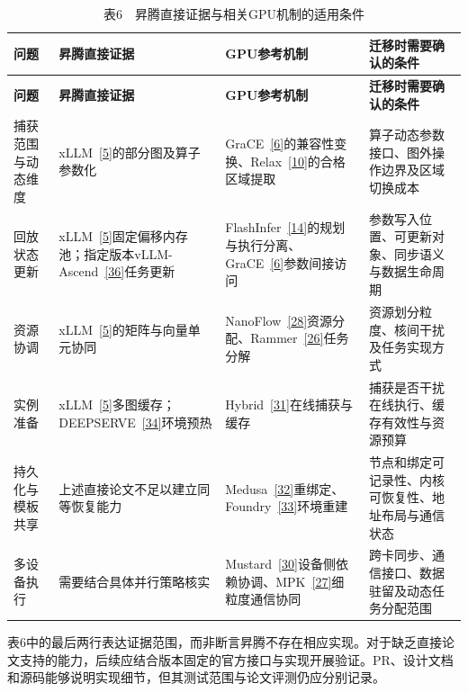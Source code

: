 \documentclass[UTF8,11pt,fontset=windows]{ctexart}
\begin{document}
\begingroup\small
\begin{longtable}[]{@{}>{\raggedright\arraybackslash}p{}>{\raggedright\arraybackslash}p{}>{\raggedright\arraybackslash}p{}>{\raggedright\arraybackslash}p{}@{}}
\caption{表6　昇腾直接证据与相关GPU机制的适用条件}\tabularnewline
\toprule
\textbf{问题} & \textbf{昇腾直接证据} & \textbf{GPU参考机制} & \textbf{迁移时需要确认的条件} \\
\midrule
\endfirsthead
\toprule
\textbf{问题} & \textbf{昇腾直接证据} & \textbf{GPU参考机制} & \textbf{迁移时需要确认的条件} \\
\midrule
\endhead
捕获范围与动态维度 & xLLM~\protect\hyperlink{ref-5}{{[}5{]}}的部分图及算子参数化 & GraCE~\protect\hyperlink{ref-6}{{[}6{]}}的兼容性变换、Relax~\protect\hyperlink{ref-10}{{[}10{]}}的合格区域提取 & 算子动态参数接口、图外操作边界及区域切换成本 \\
回放状态更新 & xLLM~\protect\hyperlink{ref-5}{{[}5{]}}固定偏移内存池；指定版本vLLM-Ascend~\protect\hyperlink{ref-36}{{[}36{]}}任务更新 & FlashInfer~\protect\hyperlink{ref-14}{{[}14{]}}的规划与执行分离、GraCE~\protect\hyperlink{ref-6}{{[}6{]}}参数间接访问 & 参数写入位置、可更新对象、同步语义与数据生命周期 \\
资源协调 & xLLM~\protect\hyperlink{ref-5}{{[}5{]}}的矩阵与向量单元协同 & NanoFlow~\protect\hyperlink{ref-28}{{[}28{]}}资源分配、Rammer~\protect\hyperlink{ref-26}{{[}26{]}}任务分解 & 资源划分粒度、核间干扰及任务实现方式 \\
实例准备 & xLLM~\protect\hyperlink{ref-5}{{[}5{]}}多图缓存；DEEPSERVE~\protect\hyperlink{ref-34}{{[}34{]}}环境预热 & Hybrid~\protect\hyperlink{ref-31}{{[}31{]}}在线捕获与缓存 & 捕获是否干扰在线执行、缓存有效性与资源预算 \\
持久化与模板共享 & 上述直接论文不足以建立同等恢复能力 & Medusa~\protect\hyperlink{ref-32}{{[}32{]}}重绑定、Foundry~\protect\hyperlink{ref-33}{{[}33{]}}环境重建 & 节点和绑定可记录性、内核可恢复性、地址布局与通信状态 \\
多设备执行 & 需要结合具体并行策略核实 & Mustard~\protect\hyperlink{ref-30}{{[}30{]}}设备侧依赖协调、MPK~\protect\hyperlink{ref-27}{{[}27{]}}细粒度通信协同 & 跨卡同步、通信接口、数据驻留及动态任务分配范围 \\
\bottomrule
\end{longtable}
\endgroup

表6中的最后两行表达证据范围，而非断言昇腾不存在相应实现。对于缺乏直接论文支持的能力，后续应结合版本固定的官方接口与实现开展验证。PR、设计文档和源码能够说明实现细节，但其测试范围与论文评测仍应分别记录。
\end{document}
